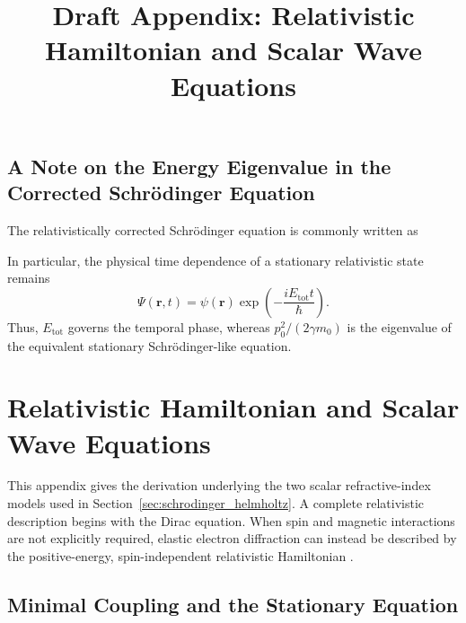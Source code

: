 \documentclass[12pt]{article}
\title{Draft Appendix: Relativistic Hamiltonian and Scalar Wave Equations}
\author{}
\date{}
\begin{document}
\maketitle%



\subsection{A Note on the Energy Eigenvalue in the Corrected Schrödinger Equation}
\label{app:corrected_schrodinger_eigenvalue}

The relativistically corrected Schrödinger equation is commonly written as



In particular, the physical time dependence of a stationary relativistic
state remains
\begin{equation}
\Psi(\mathbf r,t)
=
\psi(\mathbf r)
\exp\left(-\frac{iE_{\mathrm{tot}}t}{\hbar}\right).
\end{equation}
Thus, $E_{\mathrm{tot}}$ governs the temporal phase, whereas
$p_0^2/(2\gamma m_0)$ is the eigenvalue of the equivalent stationary
Schrödinger-like equation.



\section{Relativistic Hamiltonian and Scalar Wave Equations}
\label{app:relativistic_hamiltonian}

This appendix gives the derivation underlying the two scalar refractive-index
models used in Section~\ref{sec:schrodinger_helmholtz}. A complete relativistic
description begins with the Dirac equation. When spin and magnetic interactions
are not explicitly required, elastic electron diffraction can instead be
described by the positive-energy, spin-independent relativistic Hamiltonian
\cite{fujiwara1961relativistic,kirkland2010advanced}.

\subsection{Minimal Coupling and the Stationary Equation}
\end{document}
